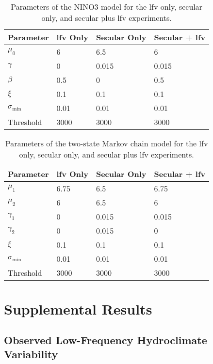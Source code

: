 \documentclass[
]{agujournal2018}
\begin{document}
\begin{table}[ht]
  \centering
  \begin{tabular}{llll}
    \toprule
    Parameter & \gls{lfv} Only & Secular Only & Secular + \gls{lfv} \\
    \midrule
    $\mu_0$             & 6     & 6.5   & 6 \\
    $\gamma$            & 0     & 0.015 & 0.015\\
    $\beta$             & 0.5   & 0     & 0.5\\
    $\xi$               & 0.1   & 0.1   & 0.1\\
    $\sigma_\text{min}$ & 0.01  & 0.01  & 0.01\\
    Threshold           & 3000  & 3000  & 3000 \\
    \bottomrule
  \end{tabular}
  \caption{
    Parameters of the NINO3 model for the \gls{lfv} only, secular only, and secular plus \gls{lfv} experiments.
  }\label{tab:nino-stationary}
\end{table}
\begin{table}[ht]
  \centering
  \begin{tabular}{llll}
    \toprule
    Parameter & \gls{lfv} Only & Secular Only & Secular + \gls{lfv} \\
    \midrule
    $\mu_1$             & 6.75  & 6.5   & 6.75\\
    $\mu_2$             & 6     & 6.5   & 6\\
    $\gamma_1$          & 0     & 0.015 & 0.015\\
    $\gamma_2$          & 0     & 0.015 & 0\\
    $\xi$               & 0.1   & 0.1   & 0.1\\
    $\sigma_\text{min}$ & 0.01  & 0.01  & 0.01\\
    Threshold           & 3000  & 3000  & 3000 \\
    \bottomrule
  \end{tabular}
  \caption{
    Parameters of the two-state Markov chain model for the \gls{lfv} only, secular only, and secular plus \gls{lfv} experiments.
  }\label{tab:markov-stationary}
\end{table}

\section{Supplemental Results}

\subsection{Observed Low-Frequency Hydroclimate Variability}\label{sec:observed-lfv}
\end{document}
